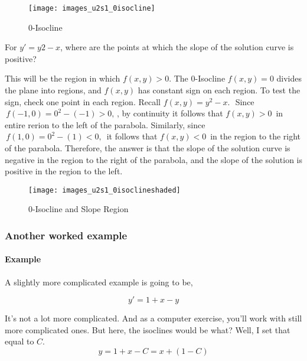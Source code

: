 \begin{figure}[ht!]
  \centering
  \texttt{[image: images\_u2s1\_0isocline]}
  \caption{$0$-Isocline}
\end{figure}

\clearpage

\begin{example}
  For $y′=y2−x$, where are the points at which the slope of the solution curve is positive?
\end{example}

\Solution This will be the region in which $f(x,y)>0$.
The $0$-Isocline $f(x,y)=0$ divides the plane into regions, and $f(x,y)$ has constant sign on each region.
To test the sign, check one point in each region.
Recall $f(x,y) = y^2-x.\, \,$ Since $\, f(-1,0)=0^2-(-1)>0,\,$, by continuity it follows that
$f(x,y)>0\,$ in entire rerion to the left of the parabola.
Similarly, since $\, f(1,0)=0^2-(1)<0,\,$ it follows that $f(x,y)<0\,$
in the region to the right of the parabola.
Therefore, the answer is that the slope of the solution curve is negative in the region to the right of the parabola, and the slope of the solution is positive in the region to the left.

\begin{figure}[ht!]
  \centering
  \texttt{[image: images\_u2s1\_0isoclineshaded]}
  \caption{$0$-Isocline and Slope Region}
\end{figure}

\clearpage

\subsubsection{Another worked example}

\paragraph{Example}
A slightly more complicated example
is going to be,

\begin{equation*}
  y' = 1 + x -y
\end{equation*}

It's not a lot more complicated.
And as a computer exercise, you'll work with still more complicated ones.
But here, the isoclines would be what?
Well, I set that equal to $C$.
\begin{equation*}
  y = 1 + x - C = x + (1 - C)
\end{equation*}

